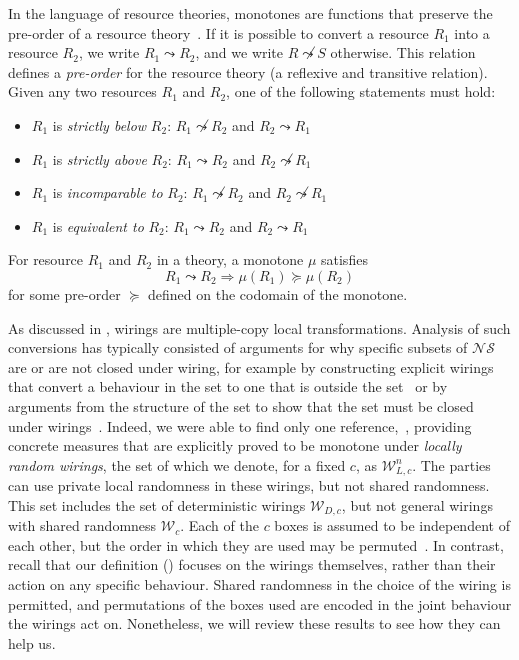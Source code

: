 \documentclass[10pt, a4paper]{article}
\numberwithin{equation}{section} %
\theoremstyle{definition}
\theoremstyle{plain}
\newcommand{\?}{\mathrel{?}} %
\newcommand{\sW}{\mathcal{W}}
\newcommand{\NSs}{\mathcal{NS}}
\begin{document}
                  In the language of resource theories, monotones are functions that preserve the pre-order of a resource theory~\cite{NonclassicalCausation}. If it is possible to convert a resource \(R_1\) into a resource \(R_2\), we write \(R_1 \leadsto R_2\), and we write \(R \not\leadsto S\) otherwise. This relation defines a \emph{pre-order} for the resource theory (a reflexive and transitive relation). Given any two resources \(R_1\) and \(R_2\), one of the following statements must hold:
                  \begin{itemize}
                    \item \(R_1\) is \emph{strictly below} \(R_2\): \(R_1 \not\leadsto R_2\) and \(R_2 \leadsto R_1\)
                    \item \(R_1\) is \emph{strictly above} \(R_2\): \(R_1 \leadsto R_2\) and \(R_2 \not\leadsto R_1\)
                    \item \(R_1\) is \emph{incomparable to} \(R_2\): \(R_1 \not\leadsto R_2\) and \(R_2 \not\leadsto R_1\)
                    \item \(R_1\) is \emph{equivalent to} \(R_2\): \(R_1 \leadsto R_2\) and \(R_2 \leadsto R_1\)
                  \end{itemize}

                  For resource \(R_1\) and \(R_2\) in a theory, a monotone \(\mu\) satisfies
                  \begin{equation}
                    R_1 \leadsto R_2 \Rightarrow \mu(R_1) \succeq \mu(R_2)
                  \end{equation}
                  for some pre-order \(\succeq\) defined on the codomain of the monotone.

                  As discussed in , wirings are multiple-copy local transformations. Analysis of such conversions has typically consisted of arguments for why specific subsets of \(\NSs\) are or are not closed under wiring, for example by constructing explicit wirings that convert a behaviour in the set to one that is outside the set~\cite{ClosedCorrSets} or by arguments from the structure of the set to show that the set must be closed under wirings~\cite{NonlocalZoo}. Indeed, we were able to find only one reference,~\cite{NLMonotones}, providing concrete measures that are explicitly proved to be monotone under \emph{locally random wirings}, the set of which we denote, for a fixed \(c\), as \(\sW_{L,c}^n\). The parties can use private local randomness in these wirings, but not shared randomness. This set includes the set of deterministic wirings \(\sW_{D,c}\), but not general wirings with shared randomness \(\sW_c\). Each of the \(c\) boxes is assumed to be independent of each other, but the order in which they are used may be permuted~\cite[Sec. 3]{NLMonotones}. In contrast, recall that our definition () focuses on the wirings themselves, rather than their action on any specific behaviour. Shared randomness in the choice of the wiring is permitted, and permutations of the boxes used are encoded in the joint behaviour the wirings act on. Nonetheless, we will review these results to see how they can help us.
\end{document}
